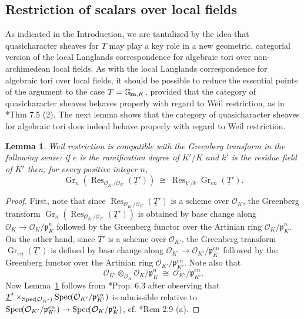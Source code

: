 \documentclass{amsart}
\theoremstyle{plain}
\newtheorem{lemma}[theorem]{Lemma}
\theoremstyle{definition}
\theoremstyle{remark}
\newcommand{\OK}{\mathcal{O}_K}
\newcommand{\pK}{\mathfrak{p}_K}
\newcommand{\OKp}{\mathcal{O}_{K'}}
\newcommand{\pKp}{\mathfrak{p}_{K'}}
\newcommand{\Gm}[1]{\mathbb{G}_{\hskip-1pt\textbf{m},#1}}
\newcommand{\TTp}{\underline{T}'}
\DeclareMathOperator{\Gr}{Gr}
\DeclareMathOperator{\Res}{Res}
\newcommand{\Spec}[1]{{\operatorname{Spec}\hskip-1pt( #1 )}}
\newcommand{\iso}{{\ \cong\ }}
\begin{document}
\subsection{Restriction of scalars over local fields}
\label{sec:wrK}

As indicated in the Introduction, we are tantalized
by the idea that quasicharacter sheaves for $T$
may play a key role in a new geometric, categorial version
of the local Langlands correspondence for algebraic tori
over non-archimedean local fields.
As with the local Langlands correspondence for algebraic tori over local fields,
it should be possible to reduce the essential points of the argument to the case $T= \Gm{K}$,
provided that the category of quasicharacter sheaves behaves properly with regard to
Weil restriction, as in \cite{yu:09a}*{Thm 7.5 (2)}.
The next lemma shows that the category of quasicharacter sheaves for
algebraic tori does indeed behave properly with regard to Weil restriction.

\begin{lemma}\label{lemma:wrK}
Weil restriction is compatible with the Greenberg transform in the following sense:
if $e$ is the ramification degree of $K'/K$ and $k'$ is the residue field of $K'$ then,
for every positive integer $n$,
\begin{equation}
\Gr_{n}\left( \Res_{\OKp/\OK}(\TTp)\right)
\iso
\Res_{k'/k} \Gr_{en}(\TTp).
\end{equation}
\end{lemma}

\begin{proof}
First, note that since $\Res_{\OKp/\OK}(\TTp)$
is a scheme over $\OK$,
the Greenberg transform $\Gr_{n}\left( \Res_{\OKp/\OK}(\TTp)\right)$
is obtained by base change along $\OK \to \OK/\pK^n$
followed by the Greenberg functor over the Artinian ring $\OK/\pK^n$.
On the other hand, since $\TTp$ is a scheme over $\OKp$,
the Greenberg transform $\Gr_{en}(\TTp)$ is defined by base change along
$\OKp \to \OKp/\pKp^{en}$
followed by the Greenberg functor over the Artinian ring $\OKp/\pKp^{en}$.
Note also that
\begin{equation}\label{nem}
\OKp \otimes_{\OK} \OK/\pK^n \iso \OKp/\pKp^{en}.
\end{equation}
Now Lemma~\ref{lemma:wrK} follows from \cite{bertrapelle-gonzales:Greenberg}*{Prop. 6.3} after observing that  $\TTp \times_\Spec{\OKp} \Spec{\OKp/\pKp^{en}}$ is admissible relative to $\Spec{\OKp/\pKp^{en}} \to \Spec{\OK/\pK^n}$, cf. \cite{bertrapelle-gonzales:Greenberg}*{Rem 2.9 (a)}.
\end{proof}
\end{document}
